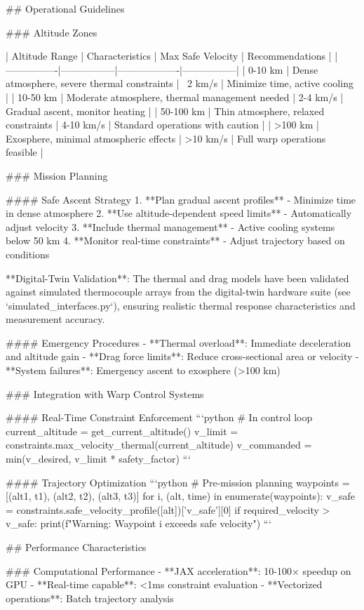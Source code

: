 ## Operational Guidelines

### Altitude Zones

| Altitude Range | Characteristics | Max Safe Velocity | Recommendations |
|----------------|-----------------|-------------------|-----------------|
| 0-10 km | Dense atmosphere, severe thermal constraints | ~2 km/s | Minimize time, active cooling |
| 10-50 km | Moderate atmosphere, thermal management needed | 2-4 km/s | Gradual ascent, monitor heating |
| 50-100 km | Thin atmosphere, relaxed constraints | 4-10 km/s | Standard operations with caution |
| >100 km | Exosphere, minimal atmospheric effects | >10 km/s | Full warp operations feasible |

### Mission Planning

#### Safe Ascent Strategy
1. **Plan gradual ascent profiles** - Minimize time in dense atmosphere
2. **Use altitude-dependent speed limits** - Automatically adjust velocity
3. **Include thermal management** - Active cooling systems below 50 km
4. **Monitor real-time constraints** - Adjust trajectory based on conditions

**Digital-Twin Validation**: The thermal and drag models have been validated against simulated thermocouple arrays from the digital-twin hardware suite (see `simulated_interfaces.py`), ensuring realistic thermal response characteristics and measurement accuracy.

#### Emergency Procedures
- **Thermal overload**: Immediate deceleration and altitude gain
- **Drag force limits**: Reduce cross-sectional area or velocity
- **System failures**: Emergency ascent to exosphere (>100 km)

### Integration with Warp Control Systems

#### Real-Time Constraint Enforcement
```python
# In control loop
current_altitude = get_current_altitude()
v_limit = constraints.max_velocity_thermal(current_altitude)
v_commanded = min(v_desired, v_limit * safety_factor)
```

#### Trajectory Optimization
```python
# Pre-mission planning
waypoints = [(alt1, t1), (alt2, t2), (alt3, t3)]
for i, (alt, time) in enumerate(waypoints):
    v_safe = constraints.safe_velocity_profile([alt])['v_safe'][0]
    if required_velocity > v_safe:
        print(f"Warning: Waypoint {i} exceeds safe velocity")
```

## Performance Characteristics

### Computational Performance
- **JAX acceleration**: 10-100× speedup on GPU
- **Real-time capable**: <1ms constraint evaluation
- **Vectorized operations**: Batch trajectory analysis

